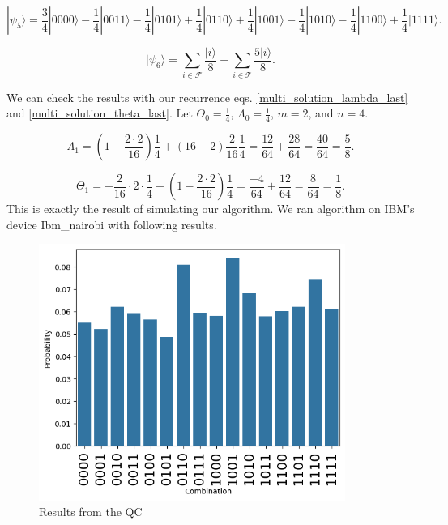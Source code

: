 \begin{equation}
    |\psi_5\rangle = \frac{3}{4}|0000\rangle-\frac{1}{4}|0011\rangle-\frac{1}{4}|0101\rangle+\frac{1}{4}|0110\rangle+\frac{1}{4}|1001\rangle-\frac{1}{4}|1010\rangle-\frac{1}{4}|1100\rangle+\frac{1}{4}|1111\rangle.
\end{equation}

\begin{equation}
    |\psi_6\rangle =  \sum_{i\in \mathcal{F}}^{} \frac{|i\rangle }{8} -\sum_{i\in \mathcal{T}}^{} \frac{5|i\rangle }{8}.
\end{equation}

We can check the results with our recurrence eqs. \ref{multi_solution_lambda_last} and \ref{multi_solution_theta_last}. Let $\Theta_0 = \frac{1}{4}$, $\Lambda_0 = \frac{1}{4}$, $m = 2$, and $n = 4$.

\begin{equation}
    \Lambda_1 = (1-\frac{2\cdot2}{16})\frac{1}{4} + (16-2)\frac{2}{16}\frac{1}{4}=\frac{12}{64}+\frac{28}{64} = \frac{40}{64} = \frac{5}{8}.
\end{equation}

\begin{equation}
    \Theta_1 = -\frac{2}{16}\cdot2\cdot\frac{1}{4} + (1-\frac{2\cdot 2}{16})\frac{1}{4} = \frac{-4}{64}+\frac{12}{64} = \frac{8}{64} = \frac{1}{8}.
\end{equation}
This is exactly the result of simulating our algorithm. We ran algorithm on IBM's device Ibm\_nairobi with following results.

\begin{figure}[H]
\centering
\includegraphics[width=10cm]{Figures/bc0_0.png}
\caption{Results from the QC}
\label{Smallb00}
\end{figure}

